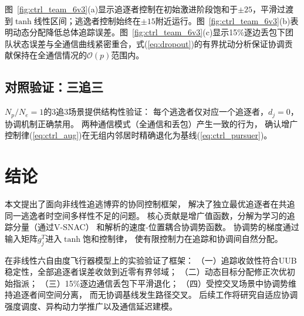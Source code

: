 \documentclass[conference]{IEEEtran}
\begin{document}
图~\ref{fig:ctrl_team_6v3}(a)显示追逐者控制在初始激进阶段饱和于$\pm 25$，平滑过渡到$\tanh$线性区间；逃逸者控制始终在$\pm 15$附近运行。图~\ref{fig:ctrl_team_6v3}(b)表明动态分配降低总体追踪误差。图~\ref{fig:ctrl_team_6v3}(c)显示15\%逐边丢包下团队状态误差与全通信曲线紧密重合，式(\ref{eq:dropout})的有界扰动分析保证协调贡献保持在全通信情况的$\mathcal{O}(p)$范围内。


\subsection{对照验证：三追三}

$N_p/N_e = 1$的3追3场景提供结构性验证：
每个逃逸者仅对应一个追逐者，$d_j = 0$，
协调机制正确禁用。
两种通信模式（全通信和丢包）产生一致的行为，
确认增广控制律(\ref{eq:ctrl_aug})在无组内邻居时精确退化为基线(\ref{eq:ctrl_pursuer})。


\section{结论}

本文提出了面向非线性追逃博弈的协同控制框架，
解决了独立最优追逐者在共追同一逃逸者时空间多样性不足的问题。
核心贡献是增广值函数，分解为学习的追踪分量（通过V-SNAC）
和解析的速度-位置耦合协调势函数。
协调势的梯度通过输入矩阵$g_j^T$进入$\tanh$饱和控制律，
使有限控制力在追踪和协调间自然分配。

在非线性六自由度飞行器模型上的实验验证了框架：
（一）追踪收敛性符合UUB稳定性，全部追逐者误差收敛到近零有界邻域；
（二）动态目标分配修正次优初始指派；
（三）15\%逐边通信丢包下平滑退化；
（四）受控交叉场景中协调势维持追逐者间空间分离，
而无协调基线发生路径交叉。
后续工作将研究自适应协调强度调度、异构动力学推广以及通信延迟建模。
\end{document}
